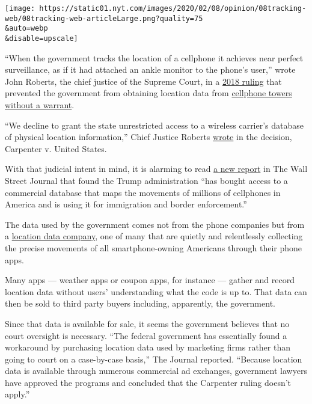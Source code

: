 \texttt{[image: https://static01.nyt.com/images/2020/02/08/opinion/08tracking-web/08tracking-web-articleLarge.png?quality=75\\\&auto=webp\\\&disable=upscale]}

``When the government tracks the location of a cellphone it achieves
near perfect surveillance, as if it had attached an ankle monitor to the
phone's user,'' wrote John Roberts, the chief justice of the Supreme
Court, in a
\href{https://www.supremecourt.gov/opinions/17pdf/16-402_h315.pdf}{2018
ruling} that prevented the government from obtaining location data from
\href{https://www.nytimes.com/2018/06/22/us/politics/supreme-court-warrants-cell-phone-privacy.html}{cellphone
towers without a warrant}.

``We decline to grant the state unrestricted access to a wireless
carrier's database of physical location information,'' Chief Justice
Roberts
\href{https://www.nytimes.com/2018/06/22/us/politics/supreme-court-warrants-cell-phone-privacy.html}{wrote}
in the decision, Carpenter v. United States.

With that judicial intent in mind, it is alarming to read
\href{https://www.wsj.com/articles/federal-agencies-use-cellphone-location-data-for-immigration-enforcement-11581078600?mod=hp_lead_pos5}{a
new report} in The Wall Street Journal that found the Trump
administration ``has bought access to a commercial database that maps
the movements of millions of cellphones in America and is using it for
immigration and border enforcement.''

The data used by the government comes not from the phone companies but
from a
\href{https://www.nytimes.com/interactive/2019/12/19/opinion/location-tracking-cell-phone.html}{location
data company}, one of many that are quietly and relentlessly collecting
the precise movements of all smartphone-owning Americans through their
phone apps.

Many apps --- weather apps or coupon apps, for instance --- gather and
record location data without users' understanding what the code is up
to. That data can then be sold to third party buyers including,
apparently, the government.

Since that data is available for sale, it seems the government believes
that no court oversight is necessary. ``The federal government has
essentially found a workaround by purchasing location data used by
marketing firms rather than going to court on a case-by-case basis,''
The Journal reported. ``Because location data is available through
numerous commercial ad exchanges, government lawyers have approved the
programs and concluded that the Carpenter ruling doesn't apply.''


